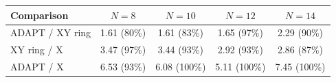 \begin{tabular}{lcccc}
\toprule
Comparison & $N=8$ & $N=10$ & $N=12$ & $N=14$ \\
\midrule
ADAPT / XY ring & 1.61 (80\%) & 1.61 (83\%) & 1.65 (97\%) & 2.29 (90\%) \\
XY ring / X & 3.47 (97\%) & 3.44 (93\%) & 2.92 (93\%) & 2.86 (87\%) \\
ADAPT / X & 6.53 (93\%) & 6.08 (100\%) & 5.11 (100\%) & 7.45 (100\%) \\
\bottomrule
\end{tabular}
